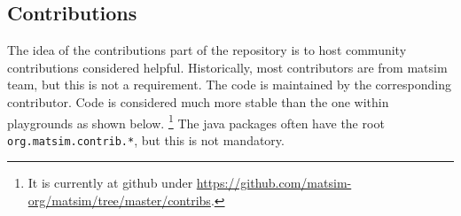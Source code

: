 \subsection{Contributions}




The idea of the \glspl{contribution} part of the repository is to host community contributions considered helpful. 
Historically, most contributors are from \gls{matsim} team, but this is not a requirement.
The code is maintained by the corresponding contributor. 
Code is considered much more stable than the one within playgrounds as shown below.%
\footnote{
It is currently at \gls{github} under \url{https://github.com/matsim-org/matsim/tree/master/contribs}.  
}
The \gls{java} packages often have the root \lstinline{org.matsim.contrib.*}, but this is not mandatory.

